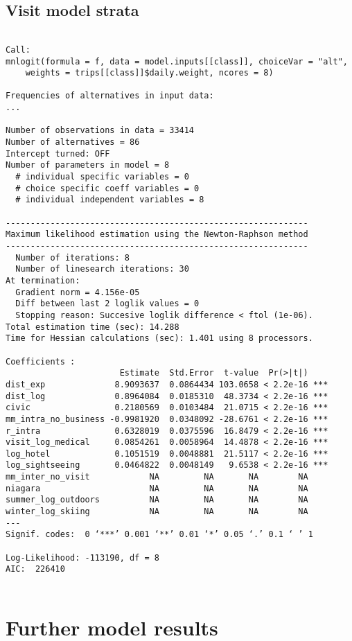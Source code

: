 \section{Visit model strata}
\begin{verbatim}

Call:
mnlogit(formula = f, data = model.inputs[[class]], choiceVar = "alt", 
    weights = trips[[class]]$daily.weight, ncores = 8)

Frequencies of alternatives in input data:
...

Number of observations in data = 33414
Number of alternatives = 86
Intercept turned: OFF
Number of parameters in model = 8
  # individual specific variables = 0
  # choice specific coeff variables = 0
  # individual independent variables = 8

-------------------------------------------------------------
Maximum likelihood estimation using the Newton-Raphson method
-------------------------------------------------------------
  Number of iterations: 8
  Number of linesearch iterations: 30
At termination: 
  Gradient norm = 4.156e-05
  Diff between last 2 loglik values = 0
  Stopping reason: Succesive loglik difference < ftol (1e-06).
Total estimation time (sec): 14.288
Time for Hessian calculations (sec): 1.401 using 8 processors.

Coefficients : 
                       Estimate  Std.Error  t-value  Pr(>|t|)    
dist_exp              8.9093637  0.0864434 103.0658 < 2.2e-16 ***
dist_log              0.8964084  0.0185310  48.3734 < 2.2e-16 ***
civic                 0.2180569  0.0103484  21.0715 < 2.2e-16 ***
mm_intra_no_business -0.9981920  0.0348092 -28.6761 < 2.2e-16 ***
r_intra               0.6328019  0.0375596  16.8479 < 2.2e-16 ***
visit_log_medical     0.0854261  0.0058964  14.4878 < 2.2e-16 ***
log_hotel             0.1051519  0.0048881  21.5117 < 2.2e-16 ***
log_sightseeing       0.0464822  0.0048149   9.6538 < 2.2e-16 ***
mm_inter_no_visit            NA         NA       NA        NA    
niagara                      NA         NA       NA        NA    
summer_log_outdoors          NA         NA       NA        NA    
winter_log_skiing            NA         NA       NA        NA    
---
Signif. codes:  0 ‘***’ 0.001 ‘**’ 0.01 ‘*’ 0.05 ‘.’ 0.1 ‘ ’ 1

Log-Likelihood: -113190, df = 8
AIC:  226410 


\end{verbatim}

\chapter{Further model results}

